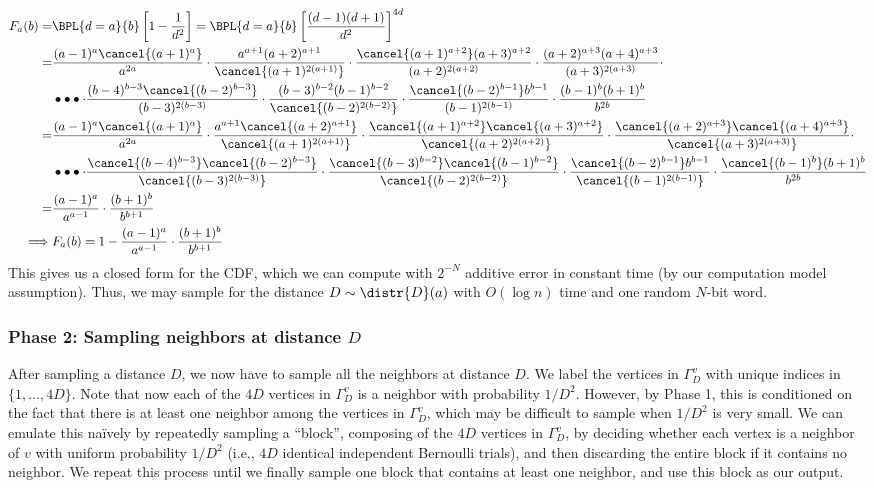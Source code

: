 \begin{align}
F_a(b) = &\BPL{d=a}{b} \left[1-\frac{1}{d^2}\right] = \BPL{d=a}{b} \left[\frac{(d-1)(d+1)}{d^2}\right]^{4d} \\
= & \frac{(a-1)^{a}\cancel{(a+1)^{a}}}{a^{2a}}\cdot\frac{a^{a+1}(a+2)^{a+1}}{\cancel{(a+1)^{2(a+1)}}}
\cdot\frac{\cancel{(a+1)^{a+2}}(a+3)^{a+2}}{(a+2)^{2(a+2)}}\cdot\frac{(a+2)^{a+3}(a+4)^{a+3}}{(a+3)^{2(a+3)}}\cdot\\
&\bullet\bullet\bullet
\cdot\frac{(b-4)^{b-3}\cancel{(b-2)^{b-3}}}{(b-3)^{2(b-3)}}\cdot\frac{(b-3)^{b-2}(b-1)^{b-2}}{\cancel{(b-2)^{2(b-2)}}}
\cdot\frac{\cancel{(b-2)^{b-1}}b^{b-1}}{(b-1)^{2(b-1)}}\cdot\frac{(b-1)^{b}(b+1)^{b}}{b^{2b}} \\
= & \frac{(a-1)^{a}\cancel{(a+1)^{a}}}{a^{2a}}\cdot\frac{a^{a+1}\cancel{(a+2)^{a+1}}}{\cancel{(a+1)^{2(a+1)}}}
\cdot\frac{\cancel{(a+1)^{a+2}}\cancel{(a+3)^{a+2}}}{\cancel{(a+2)^{2(a+2)}}}
\cdot\frac{\cancel{(a+2)^{a+3}}\cancel{(a+4)^{a+3}}}{\cancel{(a+3)^{2(a+3)}}}\cdot\\
&\bullet\bullet\bullet
\cdot\frac{\cancel{(b-4)^{b-3}}\cancel{(b-2)^{b-3}}}{\cancel{(b-3)^{2(b-3)}}}
\cdot\frac{\cancel{(b-3)^{b-2}}\cancel{(b-1)^{b-2}}}{\cancel{(b-2)^{2(b-2)}}}
\cdot\frac{\cancel{(b-2)^{b-1}}b^{b-1}}{\cancel{(b-1)^{2(b-1)}}}\cdot\frac{\cancel{(b-1)^{b}}(b+1)^{b}}{b^{2b}} \\
= & \frac{(a-1)^{a}}{a^{a-1}}\cdot\frac{(b+1)^{b}}{b^{b+1}} \\
\implies & F_a(b) = 1 - \frac{(a-1)^{a}}{a^{a-1}}\cdot\frac{(b+1)^{b}}{b^{b+1}}
\end{align}
\fi
This gives us a closed form for the CDF, which we can compute with $2^{-N}$ additive error in constant time (by our computation model assumption).
Thus, we may sample for the distance $D\sim\distr{D}(a)$ with $O(\log n)$ time and one random $N$-bit word.

\subsubsection{Phase 2: Sampling neighbors at distance $D$}
After sampling a distance $D$, we now have to sample all the neighbors at distance $D$.
We label the vertices in $\Gamma_D^v$ with unique indices in $\{1, \ldots, 4D\}$.
Note that now each of the $4D$ vertices in $\Gamma_D^v$ is a neighbor with probability $1/D^2$.
However, by Phase 1, this is conditioned on the fact that there is at least one neighbor among the vertices in $\Gamma_D^v$,
which may be difficult to sample when $1/D^2$ is very small.
We can emulate this na\"{i}vely by repeatedly sampling a ``block'', composing of the $4D$ vertices in $\Gamma_D^v$, by deciding whether each vertex is a neighbor of $v$ with uniform probability $1/D^2$ (i.e., $4D$ identical independent Bernoulli trials), and then discarding the entire block if it contains no neighbor. We repeat this process until we finally sample one block that contains at least one neighbor, and use this block as our output.


